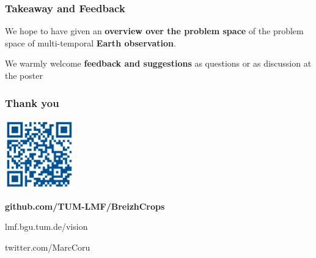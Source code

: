\documentclass[%
  aspectratio=169,
  9pt,
  USenglish,
  titlegraphic, %
  affiliationintitlepagehead,
  affiliation,
]{beamer}
\begin{document}
\begin{frame}
	\frametitle{Takeaway and Feedback}
	
	\Large
	
	We hope to have given an \textbf{overview over the problem space} of the problem space of multi-temporal \textbf{Earth observation}.
	
	\vspace{2em}
	
	We warmly welcome \textbf{feedback and suggestions} as questions or as discussion at the poster
	
	
\end{frame}

%
%	
%	
%	
%	

\begin{frame}
	\frametitle{Thank you}
	
	\centering
	\includegraphics[width=3cm]{images/qrcode}
	
	\Large\textbf{github.com/TUM-LMF/BreizhCrops}
	
	\Large
	lmf.bgu.tum.de/vision
	
	twitter.com/MarcCoru
\end{frame}
\end{document}
